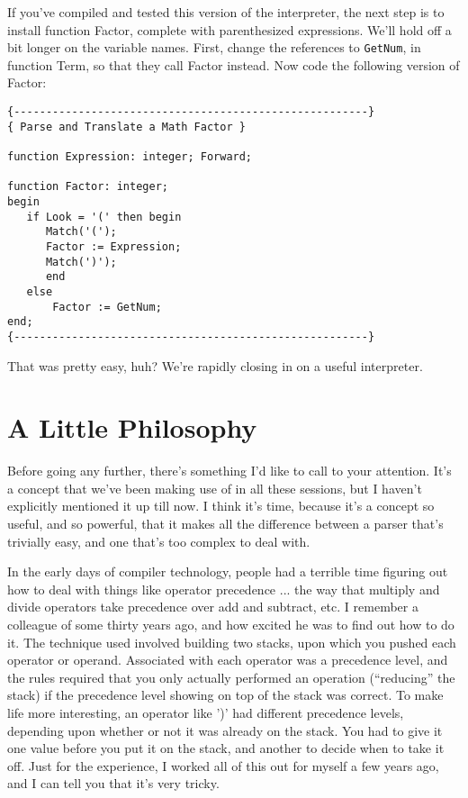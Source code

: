 If you've compiled and  tested  this  version of the interpreter, the  next  step  is to install function Factor, complete with parenthesized  expressions. We'll hold off a  bit  longer  on  the variable  names. First, change the references  to  {\tt GetNum}, in function Term, so that they call Factor instead. Now  code  the following version of Factor:

\begin{verbatim}
{-------------------------------------------------------}
{ Parse and Translate a Math Factor }

function Expression: integer; Forward;

function Factor: integer;
begin
   if Look = '(' then begin
      Match('(');
      Factor := Expression;
      Match(')');
      end
   else
       Factor := GetNum;
end;
{-------------------------------------------------------}
\end{verbatim}

That was pretty easy, huh?  We're rapidly closing in on  a useful interpreter.

\section{A Little Philosophy}

Before going any further, there's something I'd like  to  call to your attention. It's a concept that we've been making use  of in all these sessions, but I haven't explicitly mentioned it up till now. I think it's time, because it's a concept so useful, and so powerful, that  it  makes all the difference  between  a  parser that's trivially easy, and one that's too complex to deal with.

In the early days of compiler technology, people  had  a terrible time  figuring  out  how to deal with things like operator precedence  ... the  way  that  multiply  and  divide operators  take precedence over add and subtract, etc. I remember a colleague of some  thirty years ago, and how excited he was to find out how to do it. The technique used involved building two  stacks, upon which you pushed each operator  or operand. Associated with each operator was a precedence level, and the rules required that you only actually performed an operation  (``reducing''  the  stack) if the precedence level showing on top of the stack was correct. To make life more interesting, an  operator  like ')' had different precedence levels, depending  upon  whether or not it was already on the stack. You  had to give it one value before you put it on the stack, and another to decide when to take it  off. Just for the experience, I worked all of  this  out for myself a few years ago, and I can tell you that it's very tricky.

